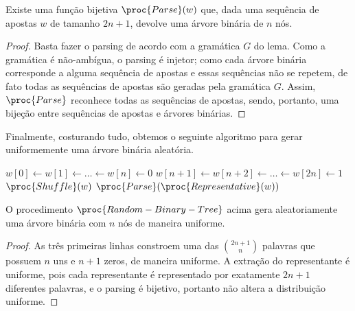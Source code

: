 \begin{corollary}
    Existe uma função bijetiva $\proc{Parse}(w)$
    que, dada uma sequência de apostas $w$ de tamanho $2n+1$,
    devolve uma árvore binária de $n$ nós.
\end{corollary}

\begin{proof}
    Basta fazer o parsing de acordo com a gramática $G$ do lema.
    Como a gramática é não-ambígua,
    o parsing é injetor;
    como cada árvore binária corresponde a alguma sequência de apostas
    e essas sequências não se repetem,
    de fato todas as sequências de apostas são geradas pela gramática $G$.
    Assim, $\proc{Parse}$ reconhece todas as sequências de apostas,
    sendo, portanto, uma bijeção entre sequências de apostas e árvores binárias.
\end{proof}

Finalmente, costurando tudo,
obtemos o seguinte algoritmo para gerar uniformemente uma árvore binária aleatória.

\begin{codebox}
    \li $w[0] \gets w[1] \gets \dots \gets w[n] \gets 0$
    \li $w[n+1] \gets w[n+2] \gets \dots \gets w[2n] \gets 1$
    \li $\proc{Shuffle}(w)$
    \li \Return $\proc{Parse}(\proc{Representative}(w))$
\end{codebox}

\begin{theorem}
    O procedimento $\proc{Random-Binary-Tree}$ acima
    gera aleatoriamente uma árvore binária com $n$ nós de maneira uniforme.
\end{theorem}

\begin{proof}
    As três primeiras linhas constroem uma das $\binom{2n+1}{n}$ palavras
    que possuem $n$ uns e $n+1$ zeros,
    de maneira uniforme.
    A extração do representante é uniforme,
    pois cada representante é representado por exatamente $2n+1$ diferentes palavras,
    e o parsing é bijetivo,
    portanto não altera a distribuição uniforme.
\end{proof}
